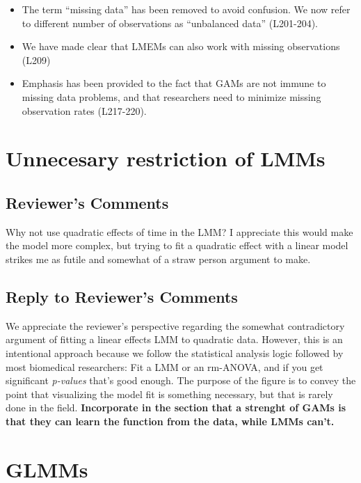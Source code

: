 \documentclass[
]{article}
\begin{document}
\begin{itemize}
\item
  The term ``missing data'' has been removed to avoid confusion. We now refer to different number of observations as ``unbalanced data'' (L201-204).
\item
  We have made clear that LMEMs can also work with missing observations (L209)
\item
  Emphasis has been provided to the fact that GAMs are not immune to missing data problems, and that researchers need to minimize missing observation rates (L217-220).
\end{itemize}

\hypertarget{unnecesary-restriction-of-lmms}{%
\section{Unnecesary restriction of LMMs}\label{unnecesary-restriction-of-lmms}}

\hypertarget{reviewers-comments-1}{%
\subsection{Reviewer's Comments}\label{reviewers-comments-1}}

Why not use quadratic effects of time in the LMM? I appreciate this would make the model more complex, but trying to fit a quadratic effect with a linear model strikes me as futile and somewhat of a straw person argument to make.

\hypertarget{section-2}{%
\subsection{\texorpdfstring{\textcolor{reviewersblue} {Reply to Reviewer's Comments}}{}}\label{section-2}}

We appreciate the reviewer's perspective regarding the somewhat contradictory argument of fitting a linear effects LMM to quadratic data. However, this is an intentional approach because we follow the statistical analysis logic followed by most biomedical researchers: Fit a LMM or an rm-ANOVA, and if you get significant \emph{p-values} that's good enough. The purpose of the figure is to convey the point that visualizing the model fit is something necessary, but that is rarely done in the field. \textbf{Incorporate in the section that a strenght of GAMs is that they can learn the function from the data, while LMMs can't.}

\hypertarget{glmms}{%
\section{GLMMs}\label{glmms}}
\end{document}

